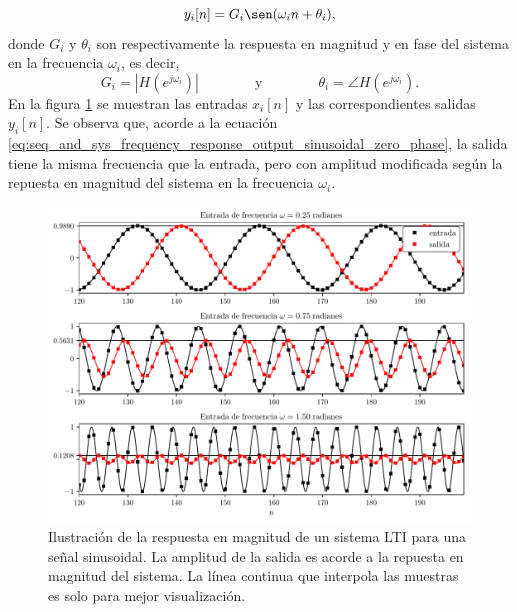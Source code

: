 \documentclass[a4paper]{report}
\begin{document}
\begin{equation}\label{eq:seq_and_sys_frequency_response_output_sinusoidal_zero_phase}
 y_i[n]=G_i\sen(\omega_in+\theta_i), 
\end{equation}
donde \(G_i\) y \(\theta_i\) son respectivamente la respuesta en magnitud y en fase del sistema en la frecuencia \(\omega_i\), es decir,
\[
 G_i=|H(e^{j\omega_i})|
 \qquad\qquad\textrm{y}\qquad\qquad
 \theta_i=\angle H(e^{j\omega_i}).
\]
En la figura \ref{fig:seq_and_sys_frequency_response_output_response_gain} se muestran las entradas \(x_i[n]\) y las correspondientes salidas \(y_i[n]\). Se observa que, acorde a la ecuación \ref{eq:seq_and_sys_frequency_response_output_sinusoidal_zero_phase}, la salida tiene la misma frecuencia que la entrada, pero con amplitud modificada según la repuesta en magnitud del sistema en la frecuencia \(\omega_i\). 
\begin{figure}[!htb]
 \begin{center}
 \includegraphics[width=\textwidth]{figuras/seq_and_sys_frequency_response_output_response_gain.pdf}
 \caption{\label{fig:seq_and_sys_frequency_response_output_response_gain} Ilustración de la respuesta en magnitud de un sistema LTI para una señal sinusoidal. La amplitud de la salida es acorde a la repuesta en magnitud del sistema. La línea continua que interpola las muestras es solo para mejor visualización.}
 \end{center}
\end{figure}
\end{document}
